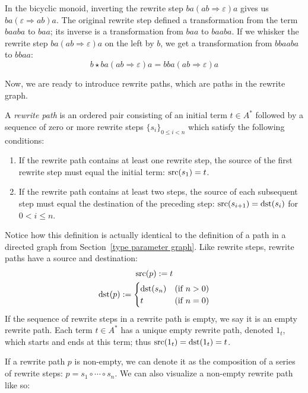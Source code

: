 \documentclass[../generics]{subfiles}
\begin{document}
\begin{example}
In the bicyclic monoid, inverting the rewrite step $ba(ab\Rightarrow\varepsilon)a$ gives us $ba(\varepsilon\Rightarrow ab)a$. The original rewrite step defined a transformation from the term $baaba$ to $baa$; its inverse is a transformation from $baa$ to $baaba$. If we whisker the rewrite step $ba(ab\Rightarrow\varepsilon)a$ on the left by $b$, we get a transformation from $bbaaba$ to $bbaa$:
\[b\star ba(ab\Rightarrow\varepsilon)a=bba(ab\Rightarrow\varepsilon)a\]

Now, we are ready to introduce rewrite paths, which are paths in the rewrite graph. 
\end{example}
\begin{definition}
%
A \emph{rewrite path} is an ordered pair consisting of an initial term $t\in A^*$ followed by a sequence of zero or more rewrite steps $\{s_i\}_{0\leq i<n}$ which satisfy the following conditions:
\begin{enumerate}
\item If the rewrite path contains at least one rewrite step, the source of the first rewrite step must equal the initial term: $\operatorname{src}(s_1)=t$.
\item If the rewrite path contains at least two steps, the source of each subsequent step must equal the destination of the preceding step: $\operatorname{src}(s_{i+1})=\operatorname{dst}(s_i)$ for $0<i\leq n$.
\end{enumerate}
Notice how this definition is actually identical to the definition of a path in a directed graph from Section~\ref{type parameter graph}. Like rewrite steps, rewrite paths have a source and destination:
\begin{gather*}
\operatorname{src}(p):=t\\
\operatorname{dst}(p):=\begin{cases}
\operatorname{dst}(s_n)&\text{(if $n>0$)}\\
t&\text{(if $n=0$)}
\end{cases}
\end{gather*}
If the sequence of rewrite steps in a rewrite path is empty, we say it is an empty rewrite path. Each term $t\in A^*$ has a unique empty rewrite path, denoted $1_t$, which starts and ends at this term; thus $\operatorname{src}(1_t)=\operatorname{dst}(1_t)=t$.

If a rewrite path $p$ is non-empty, we can denote it as the composition of a series of rewrite steps: $p=s_1\circ\cdots\circ s_n$. We can also visualize a non-empty rewrite path like so:
\begin{quote}
\end{quote}

\end{definition}
\end{document}
